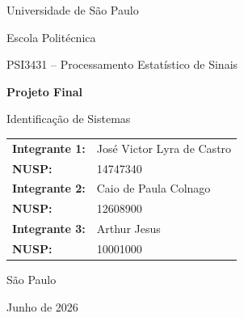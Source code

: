 \documentclass[12pt,a4paper]{article}
\begin{document}
\begin{titlepage}
    \centering

    {\Large Universidade de São Paulo\par}
    \vspace{0.3cm}
    {\large Escola Politécnica\par}
    \vspace{0.3cm}
    {\large PSI3431 -- Processamento Estatístico de Sinais\par}

    \vfill

    {\LARGE \textbf{Projeto Final}\par}
    \vspace{0.4cm}
    {\Large Identificação de Sistemas\par}

    \vfill

    \begin{center}
    \begin{tabular}{ll}
        \textbf{Integrante 1:} & José Victor Lyra de Castro \\
        \textbf{NUSP:} & 14747340 \\[0.4cm]

        \textbf{Integrante 2:} & Caio de Paula Colnago \\
        \textbf{NUSP:} & 12608900 \\[0.4cm]

        \textbf{Integrante 3:} & Arthur Jesus \\
        \textbf{NUSP:} & 10001000 \\
    \end{tabular}
    \end{center}

    \vfill

    {\large São Paulo\par}
    {\large Junho de 2026\par}

\end{titlepage}

\tableofcontents
\newpage

\end{document}

